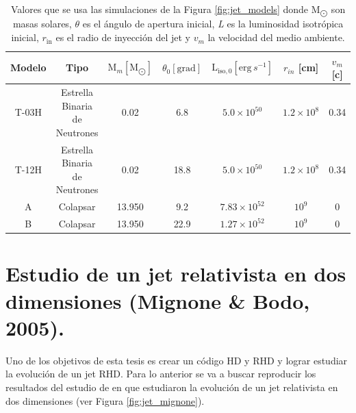 \documentclass[12pt,a4paper]{book}
\begin{document}
\begin{table}
  \begin{center}
    \begin{tabular}{ c c c c c c c} 
      \hline
      Modelo & Tipo                          & $\text{M}_{m} [\text{M}_{\bigodot}]$  & $\theta_0 [\text{grad}]$ & $\text{L}_{\text{iso},0}  [\text{erg}\,s^{-1}]$ & $r_{in} $ [cm]             & $v_m$ [c]               \\
      \hline
      T-03H  & Estrella Binaria de Neutrones & 0.02                                  &    6.8                   &               $5.0   \times 10^{50}$            &     $1.2 \times 10^8$      &   0.34  \\ 
      T-12H  & Estrella Binaria de Neutrones & 0.02                                  &    18.8                  &               $5.0   \times 10^{50}$            &     $1.2 \times 10^8$      &   0.34  \\ 
      A      & Colapsar                      & 13.950                                &    9.2                   &               $7.83  \times 10^{52}$            &     $10^9$                 &       0                 \\ 
      B      & Colapsar                      & 13.950                                &    22.9                  &               $1.27  \times 10^{52}$            &     $10^9$                 &       0                 \\ 
    \end{tabular}
  \caption{Valores que se usa las simulaciones de la Figura \ref{fig:jet_models} donde $\text{M}_{\bigodot}$ son masas solares, $\theta$ es el ángulo de apertura inicial, \emph{L} es la luminosidad isotrópica inicial,
  $r_{\text{in}}$ es el radio de inyección del jet y $v_m$ la velocidad del medio ambiente.} \label{table:jet_models}
  \end{center}
\end{table}

\section{Estudio de un jet relativista en dos dimensiones (Mignone \& Bodo, 2005).}
Uno de los objetivos de esta tesis es crear un código HD y RHD y lograr estudiar la evolución de un jet RHD. Para lo anterior se va a buscar reproducir los resultados del estudio de \citet{MB-HLLC-I} en 
que estudiaron la evolución de un jet relativista en dos dimensiones (ver Figura \ref{fig:jet_mignone}). 
\end{document}
